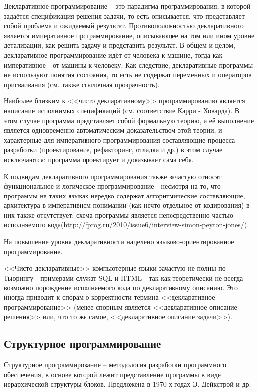 \documentclass[12pt, twoside]{report}
\begin{document}
Декларативное программирование -- это парадигма программирования, в которой задаётся спецификация решения задачи, то есть описывается, что представляет собой проблема и ожидаемый результат. Противоположностью декларативного является императивное программирование, описывающее на том или ином уровне детализации, как решить задачу и представить результат. В общем и целом, декларативное программирование идёт от человека к машине, тогда как императивное - от машины к человеку. Как следствие, декларативные программы не используют понятия состояния, то есть не содержат переменных и операторов присваивания (см. также ссылочная прозрачность).

Наиболее близким к <<чисто декларативному>> программированию является написание исполнимых спецификаций (см. соответствие Карри - Ховарда). В этом случае программа представляет собой формальную теорию, а её выполнение является одновременно автоматическим доказательством этой теории, и характерные для императивного программирования составляющие процесса разработки (проектирование, рефакторинг, отладка и др.) в этом случае исключаются: программа проектирует и доказывает сама себя.

К подвидам декларативного программирования также зачастую относят функциональное и логическое программирование - несмотря на то, что программы на таких языках нередко содержат алгоритмические составляющие, архитектура в императивном понимании (как нечто отдельное от кодирования) в них также отсутствует: схема программы является непосредственно частью исполняемого кода(http://fprog.ru/2010/issue6/interview-simon-peyton-jones/).

На повышение уровня декларативности нацелено языково-ориентированное программирование.

<<Чисто декларативные>> компьютерные языки зачастую не полны по Тьюрингу - примерами служат SQL и HTML - так как теоретически не всегда возможно порождение исполняемого кода по декларативному описанию. Это иногда приводит к спорам о корректности термина <<декларативное программирование>> (менее спорным является <<декларативное описание решения>> или, что то же самое, <<декларативное описание задачи>>).

\subsection*{Структурное программирование}

Структурное программирование -- методология разработки программного обеспечения, в основе которой лежит представление программы в виде иерархической структуры блоков. Предложена в 1970-х годах Э. Дейкстрой и др.
\end{document}
